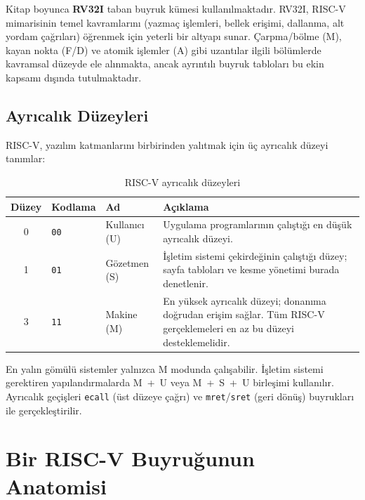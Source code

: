 \begin{bilginot}
Kitap boyunca \textbf{RV32I} taban buyruk kümesi kullanılmaktadır. RV32I, RISC-V mimarisinin temel kavramlarını (yazmaç işlemleri, bellek erişimi, dallanma, alt yordam çağrıları) öğrenmek için yeterli bir altyapı sunar. Çarpma/bölme (M), kayan nokta (F/D) ve atomik işlemler (A) gibi uzantılar ilgili bölümlerde kavramsal düzeyde ele alınmakta, ancak ayrıntılı buyruk tabloları bu ekin kapsamı dışında tutulmaktadır.
\end{bilginot}

\subsection{Ayrıcalık Düzeyleri}
\label{subsec:ekc-ayricalik}

RISC-V, yazılım katmanlarını birbirinden yalıtmak için üç ayrıcalık düzeyi tanımlar:

\begin{table}[H]
\centering
\caption{RISC-V ayrıcalık düzeyleri}\label{tab:ekc-ayricalik}
\begin{tabular}{@{}cllp{7.5cm}@{}}
\toprule
\textbf{Düzey} & \textbf{Kodlama} & \textbf{Ad} & \textbf{Açıklama} \\
\midrule
0 & \texttt{00} & Kullanıcı (U) & Uygulama programlarının çalıştığı en düşük ayrıcalık düzeyi. \\
1 & \texttt{01} & Gözetmen (S) & İşletim sistemi çekirdeğinin çalıştığı düzey; sayfa tabloları ve kesme yönetimi burada denetlenir. \\
3 & \texttt{11} & Makine (M) & En yüksek ayrıcalık düzeyi; donanıma doğrudan erişim sağlar. Tüm RISC-V gerçeklemeleri en az bu düzeyi desteklemelidir. \\
\bottomrule
\end{tabular}
\end{table}

En yalın gömülü sistemler yalnızca M modunda çalışabilir. İşletim sistemi gerektiren yapılandırmalarda M~+~U veya M~+~S~+~U birleşimi kullanılır. Ayrıcalık geçişleri \texttt{ecall} (üst düzeye çağrı) ve \texttt{mret}/\texttt{sret} (geri dönüş) buyrukları ile gerçekleştirilir.

\section{Bir RISC-V Buyruğunun Anatomisi}
\label{sec:ekc-buyruk-anatomisi}


